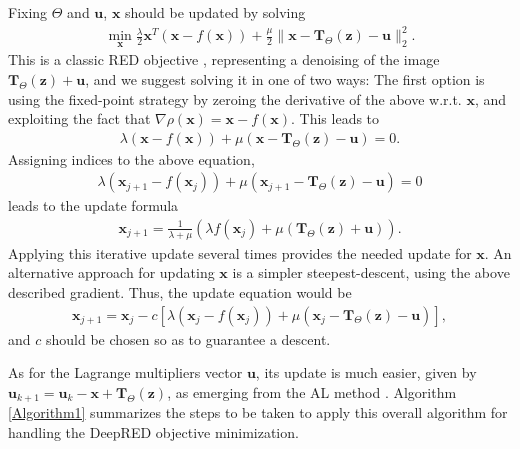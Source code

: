 \documentclass[12pt]{article}
\def\x{{\mathbf x}}
\def\u{ \mathbf{u}}
\def\z{{\mathbf z}}
\def\u{{\mathbf u}}
\def\T{{\mathbf T}}
\begin{document}
Fixing $\Theta$ and $\u$, $\x$ should be updated by solving 
\begin{eqnarray}\label{eq:UpdateX}
\min_{\x} \frac{\lambda}{2}\x^T\left(\x-f(\x)\right) + \frac{\mu}{2}\|\x - \T_{\Theta}(\z) - \u\|_2^2.
\end{eqnarray}
This is a classic RED objective \cite{RED-2017}, representing a denoising of the image $\T_{\Theta}(\z) + \u$, and we suggest solving it in one of two ways: The first option is using the fixed-point strategy by zeroing the derivative of the above w.r.t. $\x$, and exploiting the fact that $\nabla \rho(\x) = \x-f(\x)$. This leads to 
\begin{eqnarray}\label{eq:FixedPointX-A}
\lambda \left(\x-f(\x)\right) + \mu\left(\x - \T_{\Theta}(\z) - \u\right) = 0.
\end{eqnarray}
Assigning indices to the above equation, 
\begin{eqnarray}\label{eq:FixedPointX-B}
\lambda \left(\x_{j+1}-f(\x_{j})\right) + \mu\left(\x_{j+1} - \T_{\Theta}(\z) - \u\right) = 0
\end{eqnarray}
leads to the update formula
\begin{eqnarray}\label{eq:FixedPointX-C}
\x_{j+1} = \frac{1}{\lambda+\mu} \left(\lambda f(\x_{j}) + \mu( \T_{\Theta}(\z) + \u)\right).
\end{eqnarray}
Applying this iterative update several times provides the needed update for $\x$. 
An alternative approach for updating $\x$ is a simpler steepest-descent, using the above described gradient. Thus, the update equation would be 
\begin{eqnarray}\label{eq:SD-X}
\x_{j+1} = \x_j - c\left[ \lambda \left(\x_j-f(\x_j)\right) + \mu\left(\x_j - \T_{\Theta}(\z) - \u\right)\right],
\end{eqnarray}
and $c$ should be chosen so as to guarantee a descent. 

As for the Lagrange multipliers vector $\u$, its update is much easier, given by $\u_{k+1} = \u_{k} - \x + \T_{\Theta}(\z)$, as emerging from the AL method \cite{ADMM, AL}. Algorithm \ref{Algorithm1} summarizes the steps to be taken to apply this overall algorithm for handling the DeepRED objective minimization. 
\end{document}
